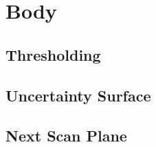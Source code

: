 \chapter{Body}

\section{Thresholding}\label{section:thresholding}

\section{Uncertainty Surface}\label{section:uncertaintysurface}

\section{Next Scan Plane}\label{section:nextscanplane}